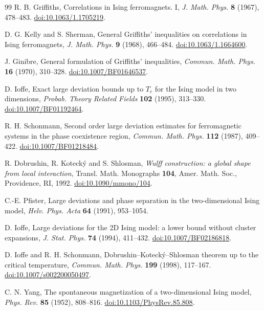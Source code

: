 \begin{thebibliography}{99}
R. B. Griffiths,
Correlations in Ising ferromagnets. I,
\emph{J. Math. Phys.} \textbf{8} (1967), 478--483.
\href{https://doi.org/10.1063/1.1705219}{doi:10.1063/1.1705219}.

D. G. Kelly and S. Sherman,
General Griffiths' inequalities on correlations in Ising ferromagnets,
\emph{J. Math. Phys.} \textbf{9} (1968), 466--484.
\href{https://doi.org/10.1063/1.1664600}{doi:10.1063/1.1664600}.

J. Ginibre,
General formulation of Griffiths' inequalities,
\emph{Commun. Math. Phys.} \textbf{16} (1970), 310--328.
\href{https://doi.org/10.1007/BF01646537}{doi:10.1007/BF01646537}.

D. Ioffe,
Exact large deviation bounds up to $T_c$ for the Ising model in two dimensions,
\emph{Probab. Theory Related Fields} \textbf{102} (1995), 313--330.
\href{https://doi.org/10.1007/BF01192464}{doi:10.1007/BF01192464}.

R. H. Schonmann,
Second order large deviation estimates for ferromagnetic systems in the phase coexistence region,
\emph{Commun. Math. Phys.} \textbf{112} (1987), 409--422.
\href{https://doi.org/10.1007/BF01218484}{doi:10.1007/BF01218484}.

R. Dobrushin, R. Koteck\'y and S. Shlosman,
\emph{Wulff construction: a global shape from local interaction},
Transl. Math. Monographs \textbf{104}, Amer. Math. Soc., Providence, RI, 1992.
\href{https://doi.org/10.1090/mmono/104}{doi:10.1090/mmono/104}.

C.-E. Pfister,
Large deviations and phase separation in the two-dimensional Ising model,
\emph{Helv. Phys. Acta} \textbf{64} (1991), 953--1054.

D. Ioffe,
Large deviations for the 2D Ising model: a lower bound without cluster expansions,
\emph{J. Stat. Phys.} \textbf{74} (1994), 411--432.
\href{https://doi.org/10.1007/BF02186818}{doi:10.1007/BF02186818}.

D. Ioffe and R. H. Schonmann,
Dobrushin--Koteck\'y--Shlosman theorem up to the critical temperature,
\emph{Commun. Math. Phys.} \textbf{199} (1998), 117--167.
\href{https://doi.org/10.1007/s002200050497}{doi:10.1007/s002200050497}.

C. N. Yang,
The spontaneous magnetization of a two-dimensional Ising model,
\emph{Phys. Rev.} \textbf{85} (1952), 808--816.
\href{https://doi.org/10.1103/PhysRev.85.808}{doi:10.1103/PhysRev.85.808}.


\end{thebibliography}
